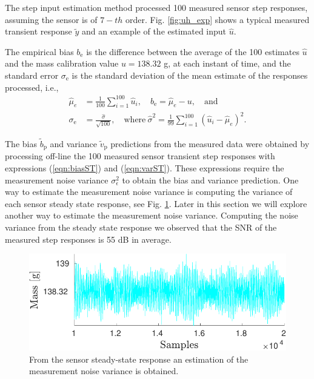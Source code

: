 The step input estimation method processed 100 measured sensor step responses, assuming the sensor is of $\mathrm{7-}th$ order.
Fig. \ref{fig:uh_exp} shows a typical measured transient response $\widetilde{y}$ and an example of the estimated input $\widehat{u}$.

The empirical bias $b_{\mathrm{e}}$ is the difference between the average of the 100 estimates $\widehat{u}$ and the mass calibration value \linebreak $u = 138.32$ g, at each instant of time, and the standard error $\sigma_\mathrm{e}$ is the standard deviation of the mean estimate of the responses processed, i.e.,
\begin{equation} \begin{aligned} \widehat{\mu}_{e} &= \frac{1}{100} \sum_{i=1}^{100}{ \widehat{u}_{i} }, \quad {b}_{\mathrm{e}} = \widehat{\mu}_{e} - u, \quad \mathrm{and} \\  \sigma_{\mathrm{e}} &= \frac{\widehat{\sigma}}{\sqrt{100}}, \quad \mathrm{where} \ \widehat{\sigma}^2 = \frac{1}{99} \sum_{i=1}^{100}{ \left( \widehat{u}_i - \widehat{\mu}_{e} \right)^2 } . \end{aligned} \end{equation}


The bias $\widetilde{b}_{\mathrm{p}}$ and variance $\widetilde{v}_{\mathrm{p}}$ predictions from the measured data were obtained by processing off-line the 100 measured sensor transient step responses with expressions (\ref{eqn:biasST}) and (\ref{eqn:varST}).
These expressions require the measurement noise variance $\sigma_\epsilon^2$ to obtain the bias and variance prediction.
One way to estimate the measurement noise variance is computing the variance of each sensor steady state response, see Fig. \ref{fig:y_ss}.
Later in this section we will explore another way to estimate the measurement noise variance.
Computing the noise variance from the steady state response we observed that the SNR of the measured step responses is 55 dB in average.

\begin{figure}[!htb]
\centering
\includegraphics[width=1.0\columnwidth]{./ChapterExperimentalValidation/fig/Fig_7.pdf}
\caption{ \label{fig:y_ss} 
From the sensor steady-state response an estimation of the measurement noise variance is obtained.}
\end{figure}

